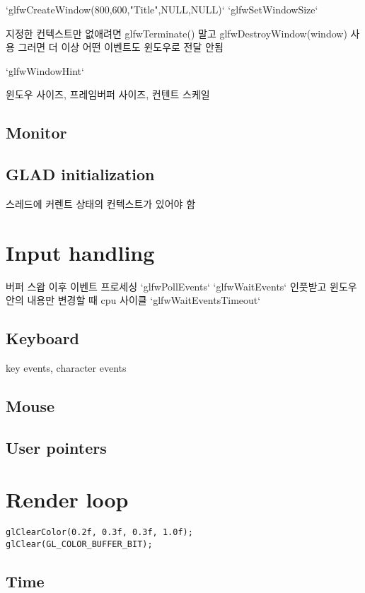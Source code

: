 \documentclass[a4paper]{report}
\begin{document}
`glfwCreateWindow(800,600,"Title",NULL,NULL)`
`glfwSetWindowSize`

지정한 컨텍스트만 없애려면 glfwTerminate() 말고 glfwDestroyWindow(window) 사용
그러면 더 이상 어떤 이벤트도 윈도우로 전달 안됨

`glfwWindowHint`


윈도우 사이즈, 프레임버퍼 사이즈, 컨텐트 스케일

\subsection{Monitor}





\subsection{GLAD initialization}

스레드에 커렌트 상태의 컨텍스트가 있어야 함


\section{Input handling}
버퍼 스왑 이후 이벤트 프로세싱
`glfwPollEvents`
`glfwWaitEvents`
인풋받고 윈도우 안의 내용만 변경할 때 cpu 사이클
`glfwWaitEventsTimeout`

\subsection{Keyboard}
key events, character events

\subsection{Mouse}

\subsection{User pointers}


\section{Render loop}

\begin{lstlisting}
glClearColor(0.2f, 0.3f, 0.3f, 1.0f);  
glClear(GL_COLOR_BUFFER_BIT);
\end{lstlisting}


\subsection{Time}
\end{document}
